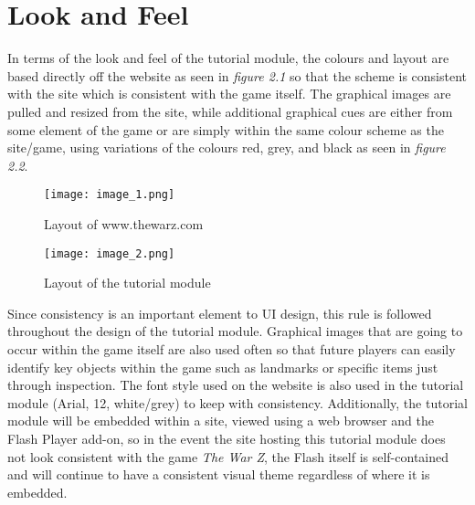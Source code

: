 \documentclass[12pt]{report}
\begin{document}
\section{Look and Feel}
In terms of the look and feel of the tutorial module, the colours and layout are based directly off the website as seen in \textit{figure 2.1} so that the scheme is consistent with the site which is consistent with the game itself. The graphical images are pulled and resized from the site, while additional graphical cues are either from some element of the game or are simply within the same colour scheme as the site/game, using variations of the colours red, grey, and black as seen in \textit{figure 2.2}.
\begin{figure}
\begin{center}
\leavevmode
\texttt{[image: image\_1.png]}
\end{center}
\caption{Layout of www.thewarz.com}
\label{fig:warzcom}
\end{figure}

\begin{figure}
\begin{center}
\leavevmode
\texttt{[image: image\_2.png]}
\end{center}
\caption{Layout of the tutorial module}
\label{fig:warztutmod}
\end{figure}
Since consistency is an important element to UI design, this rule is followed throughout the design of the tutorial module. Graphical images that are going to occur within the game itself are also used often so that future players can easily identify key objects within the game such as landmarks or specific items just through inspection. The font style used on the website is also used in the tutorial module (Arial, 12, white/grey) to keep with consistency. Additionally, the tutorial module will be embedded within a site, viewed using a web browser and the Flash Player add-on, so in the event the site hosting this tutorial module does not look consistent with the game \textit{The War Z}, the Flash itself is self-contained and will continue to have a consistent visual theme regardless of where it is embedded.
\end{document}
